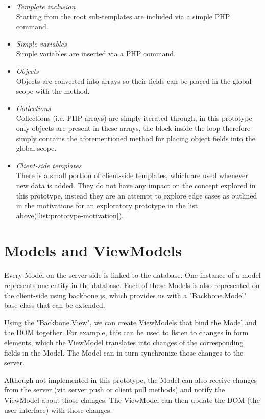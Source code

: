 \begin{itemize}
	\item \emph{Template inclusion}\\
	Starting from the root sub-templates are included via a simple
	PHP  command.
	\item \emph{Simple variables}\\
	Simple variables are inserted via a PHP  command.
	\item \emph{Objects}\\
	Objects are converted into arrays so their fields can be placed in the global
	scope with the  method.
	\item \emph{Collections}\\
	Collections (i.e. PHP arrays) are simply iterated through, in this prototype
	only objects are present in these arrays, the block inside the
	 loop therefore simply contains the aforementioned method
	for placing object fields into the global scope.
	\item \emph{Client-side templates}\\
	There is a small portion of client-side templates, which are used whenever new
	data is added.  They do not have any impact on the concept explored in
	this prototype, instead they are an attempt to explore edge cases as outlined
	in the motivations for an exploratory prototype in the list
	above(\ref{list:prototype-motivation}).
\end{itemize}

\section{Models and ViewModels}
Every Model on the server-side is linked to the database.
One instance of a model represents one entity in the database.
Each of these Models is also represented on the client-side using backbone.js,
which provides us with a "Backbone.Model" base class that can be extended.

Using the "Backbone.View", we can create ViewModels that bind the Model and the
DOM together. For example, this can be used to listen to changes in
form elements, which the ViewModel translates into changes of the corresponding
fields in the Model. The Model can in turn synchronize those changes to the
server.

Although not implemented in this prototype, the Model can also receive changes
from the server (via server push or client pull methods) and notify
the ViewModel about those changes. The ViewModel can then update the
DOM (the user interface) with those changes.

